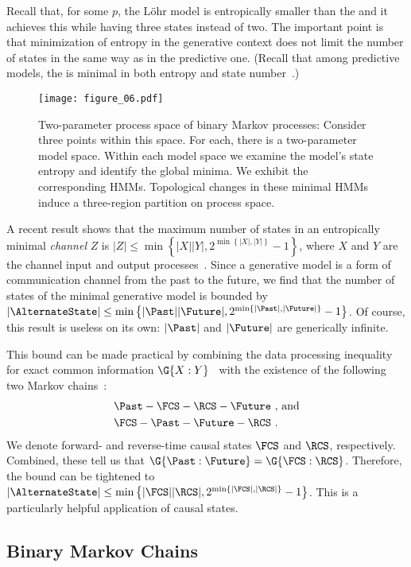 \documentclass[final,nofootinbib,aps,pre,twocolumn,showpacs,groupaddress,preprintnumbers,floatfix]{revtex4-1}
\newcommand{\Lohr}{L{\"o}hr\xspace}
\begin{document}
Recall that, for some $p$, the \Lohr model is entropically smaller than the \eM
and it achieves this while having three states instead of two. The important
point is that minimization of entropy in the generative context does not limit
the number of states in the same way as in the predictive one. (Recall that
among predictive models, the \eM is minimal in both entropy and state
number~\cite{Shal98a}.)

\begin{figure*}
\centering
\texttt{[image: figure\_06.pdf]}
 \caption{Two-parameter process space of binary Markov processes: Consider
	three points within this space. For each, there is a two-parameter model
	space. Within each model space we examine the model's state entropy and
	identify the global minima. We exhibit the corresponding HMMs. Topological
	changes in these minimal HMMs induce a three-region partition on process
	space.
  }
\label{fig:big_diagram}
\end{figure*}

A recent result shows that the maximum number of states in an entropically
minimal \emph{channel} $Z$ is $|Z| \leq \min \left\{ |X||Y|,
2^{\min\left\{|X|,|Y|\right\}} - 1 \right\}$, where $X$ and $Y$ are the channel
input and output processes~\cite{kumar2014exact}. Since a generative model is a
form of 	communication channel from the past to the future, we find that the
number of states of the minimal generative model is bounded by
$|\AlternateState| \leq \min \left\{ |\Past||\Future|,
2^{\min\left\{|\Past|,|\Future|\right\}} - 1 \right\}$. Of course, this result
is useless on its own: $|\Past|$ and $|\Future|$ are generically infinite.

This bound can be made practical by combining the data processing inequality
for exact common information $\G{X:Y}$~\cite{kumar2014exact} with the existence of the following two Markov chains~\cite{james2017trimming}:
\begin{align*}
  &\Past - \FCS - \RCS - \Future \ , \, \textrm{and} \\
  &\FCS - \Past - \Future - \RCS
  ~.
\end{align*}
We denote forward- and reverse-time causal states $\FCS$ and $\RCS$, respectively. Combined, these tell us that $\G{\Past:\Future} = \G{\FCS:\RCS}$. Therefore, the bound can be tightened to $|\AlternateState| \leq \min \left\{ |\FCS||\RCS|, 2^{\min\left\{|\FCS|,|\RCS|\right\}} - 1 \right\}$. This is a
particularly helpful application of causal states.

\subsection{Binary Markov Chains}
\label{sec:bmc_gen}
\end{document}
